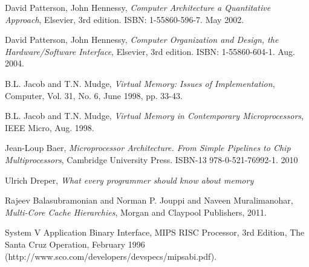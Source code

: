 \documentclass[9pt,a4paper]{article}
\begin{document}
\renewcommand\refname{Lecturas}

\begin{thebibliography}{9}

    David Patterson, John Hennessy, \textit{Computer Architecture a Quantitative Approach}, Elsevier, 3rd edition. ISBN: 1-55860-596-7. May 2002.  
  

    David Patterson, John Hennessy, \textit{Computer Organization and Design, the Hardware/Software Interface},  Elsevier, 3rd edition. ISBN: 1-55860-604-1. Aug. 2004. 
    

    B.L. Jacob and T.N. Mudge, \textit{Virtual Memory: Issues of Implementation}, Computer, Vol. 31, No. 6, June 1998, pp. 33-43.


    B.L. Jacob and T.N. Mudge, \textit{Virtual Memory in Contemporary Microprocessors}, IEEE Micro, Aug. 1998.
    

    Jean-Loup Baer, \textit{Microprocessor Architecture. From Simple Pipelines to Chip Multiprocessors}, Cambridge University Press. ISBN-13 978-0-521-76992-1. 2010

    
    Ulrich Dreper, \textit {What every programmer should know about memory}

    
    Rajeev Balasubramonian and Norman P. Jouppi and Naveen Muralimanohar, \textit{Multi-Core Cache Hierarchies}, Morgan and Claypool Publishers, 2011.
    
    
    System V Application Binary Interface, MIPS RISC Processor, 3rd Edition, The Santa Cruz Operation, February 1996 (http://www.sco.com/developers/devspecs/mipsabi.pdf).
\end{thebibliography}
\end{document}
